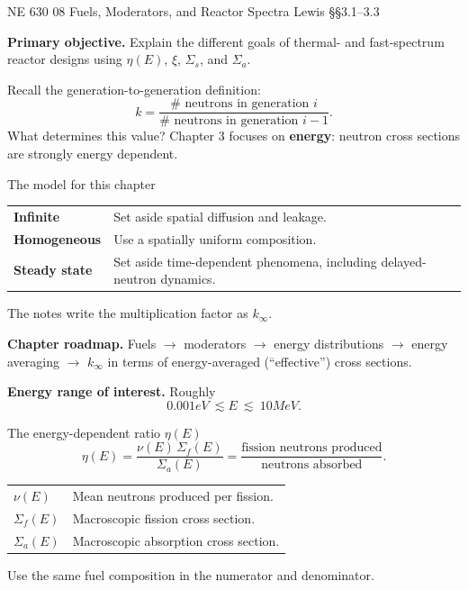 \HandoutSetup
  {NE 630}
  {08}
  {Fuels, Moderators, and Reactor Spectra}
  {Lewis \S\S3.1--3.3}


\MakeHandoutTitle

\textcolor{KSUDeepPurple}{\textbf{Primary objective.}}
Explain the different goals of thermal- and fast-spectrum reactor designs
using $\eta(E)$, $\xi$, $\Sigma_s$, and $\Sigma_a$.
\par\vspace{5pt}

\begin{handoutcolumns}
Recall the generation-to-generation definition:
$$
k=\frac{\#\text{ neutrons in generation }i}
       {\#\text{ neutrons in generation }i-1}.
$$
What determines this value? Chapter 3 focuses on \textbf{energy}:
neutron cross sections are strongly energy dependent.

\begin{fixedbox}{The model for this chapter}
\renewcommand{\arraystretch}{1.10}
\begin{tabularx}{\linewidth}{@{}l >{\raggedright\arraybackslash}X@{}}
\textbf{Infinite} & Set aside spatial diffusion and leakage.\\
\textbf{Homogeneous} & Use a spatially uniform composition.\\
\textbf{Steady state} & Set aside time-dependent phenomena, including delayed-neutron dynamics.
\end{tabularx}
\medskip
The notes write the multiplication factor as $k_\infty$.
\end{fixedbox}

\textbf{Chapter roadmap.} Fuels $\to$ moderators $\to$ energy distributions
$\to$ energy averaging $\to$ $k_\infty$ in terms of
energy-averaged (``effective'') cross sections.

\textbf{Energy range of interest.} Roughly
$$
0.001\unit{eV}\ \lesssim E\ \lesssim\ 10\unit{MeV}.
$$

\begin{fixedbox}{The energy-dependent ratio $\eta(E)$}
$$
\eta(E)=\frac{\nu(E)\,\Sigma_f(E)}{\Sigma_a(E)}
       =\frac{\text{fission neutrons produced}}{\text{neutrons absorbed}}.
$$
\par
\renewcommand{\arraystretch}{1.10}
\begin{tabularx}{\linewidth}{@{}l >{\raggedright\arraybackslash}X@{}}
$\nu(E)$ & Mean neutrons produced per fission.\\
$\Sigma_f(E)$ & Macroscopic fission cross section.\\
$\Sigma_a(E)$ & Macroscopic absorption cross section.
\end{tabularx}\par
Use the same fuel composition in the numerator and denominator.
\end{fixedbox}


\end{handoutcolumns}
